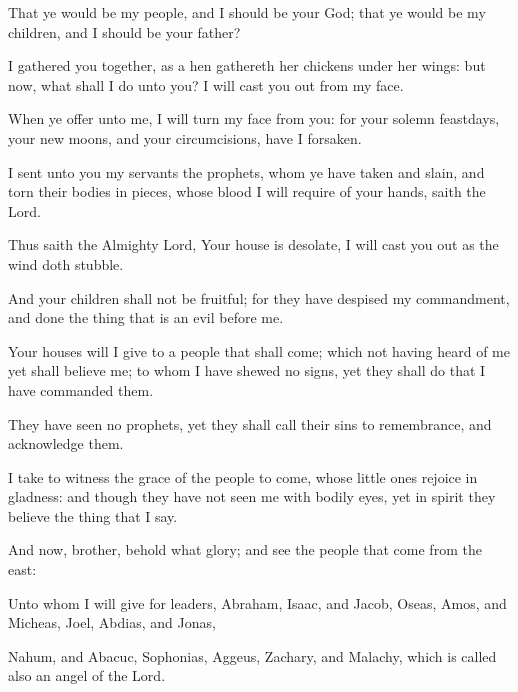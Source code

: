 {\par }{\PP {}That ye would be my people, and I should be your God; that ye would be my children, and I should be your father?
\par }{\PP {}I gathered you together, as a hen gathereth her chickens under her wings: but now, what shall I do unto you? I will cast you out from my face.
\par }{\PP {}When ye offer unto me, I will turn my face from you: for your solemn feastdays, your new moons, and your circumcisions, have I forsaken.
\par }{\PP {}I sent unto you my servants the prophets, whom ye have taken and slain, and torn their bodies in pieces, whose blood I will require of your hands, saith the Lord.
\par }{\PP {}Thus saith the Almighty Lord, Your house is desolate, I will cast you out as the wind doth stubble.
\par }{\PP {}And your children shall not be fruitful; for they have despised my commandment, and done the thing that is an evil before me.
\par }{\PP {}Your houses will I give to a people that shall come; which not having heard of me yet shall believe me; to whom I have shewed no signs, yet they shall do that I have commanded them.
\par }{\PP {}They have seen no prophets, yet they shall call their sins to remembrance, and acknowledge them.
\par }{\PP {}I take to witness the grace of the people to come, whose little ones rejoice in gladness: and though they have not seen me with bodily eyes, yet in spirit they believe the thing that I say.
\par }{\PP {}And now, brother, behold what glory; and see the people that come from the east:
\par }{\PP {}Unto whom I will give for leaders, Abraham, Isaac, and Jacob, Oseas, Amos, and Micheas, Joel, Abdias, and Jonas,
\par }{\PP {}Nahum, and Abacuc, Sophonias, Aggeus, Zachary, and Malachy, which is called also an angel of the Lord.

}
